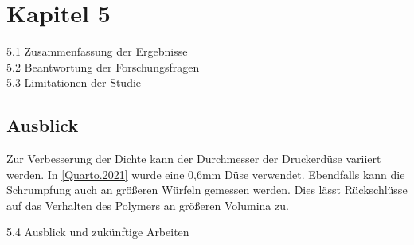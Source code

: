 \chapter{Kapitel 5}

5.1 Zusammenfassung der Ergebnisse\\
5.2 Beantwortung der Forschungsfragen\\
5.3 Limitationen der Studie\\

\section{Ausblick}

Zur Verbesserung der Dichte kann der Durchmesser der Druckerdüse variiert werden. In \autoref{Quarto.2021} wurde eine 0,6mm Düse verwendet. Ebendfalls kann die Schrumpfung auch an größeren Würfeln gemessen werden. Dies lässt Rückschlüsse auf das Verhalten des Polymers an größeren Volumina zu.

5.4 Ausblick und zukünftige Arbeiten